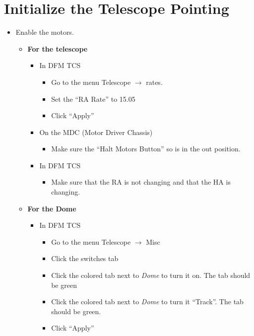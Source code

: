 \documentclass[letterpaper, 12pt]{report}
\begin{document}
\section{Initialize the Telescope Pointing}
\begin{itemize}
	\item Enable the motors.
		\begin{itemize}
			\item \textbf{For the telescope}
			\begin{itemize}
				\item In DFM TCS
				\begin{itemize}
					\item Go to the menu Telescope $\rightarrow$ rates.
					\item Set the ``RA Rate'' to 15.05
					\item Click ``Apply''
				\end{itemize}
				\item On the MDC (Motor Driver Chassis)
				\begin{itemize}
					\item Make sure the ``Halt Motors Button'' so is in the out position.
				\end{itemize}
				\end{itemize}
				\begin{itemize}
					\item In DFM TCS
					\begin{itemize}
						\item Make sure that the RA is not changing and that the HA is changing.
					\end{itemize}
				\end{itemize}
				\end{itemize}
				\begin{itemize}
					\item \textbf{For the Dome}
					\begin{itemize}
						\item In DFM TCS
						\begin{itemize}
							\item Go to the menu Telescope $\rightarrow$ Misc
							\item Click the switches tab
							\item Click the colored tab next to \emph{Dome} to turn it on. The tab should be green
							\item Click the colored tab next to \emph{Dome} to turn it ``Track''. The tab should be green.
							\item Click ``Apply''

\end{itemize}
\end{itemize}
\end{itemize}
\end{itemize}
\end{document}
